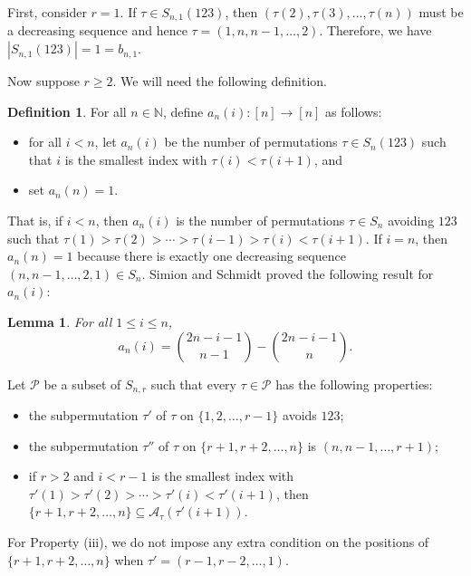\documentclass[11pt]{article}
\newtheorem{lemma}[theorem]{Lemma}
\theoremstyle{definition}
\newtheorem{definition}[theorem]{Definition}
\numberwithin{equation}{section}
\begin{document}
First, consider $r=1$. If $\tau\in S_{n,1}(123)$, then $(\tau(2),\tau(3),\ldots,\tau(n))$ must be a decreasing sequence and hence $\tau=(1,n,n-1,\ldots,2)$. Therefore, we have $|S_{n,1}(123)|=1=b_{n,1}$.

Now suppose $r\geq2$. We will need the following definition.

\begin{definition}\label{Definition:AscendIn123Avoiding}
For all $n\in\mathbb{N}$, define $a_{n}(i):[n]\to[n]$ as follows:
\begin{itemize}
\item[(i)] for all $i<n$, let $a_{n}(i)$ be the number of permutations $\tau\in S_n(123)$ such that $i$ is the smallest index with $\tau(i)<\tau(i+1)$, and
\item[(ii)] set $a_{n}(n)=1$.
\end{itemize}
\end{definition}
That is, if $i<n$, then $a_n(i)$ is the number of permutations $\tau\in S_n$ avoiding $123$ such that $\tau(1)>\tau(2)>\cdots>\tau(i-1)>\tau(i)<\tau(i+1)$. 
If $i=n$, then $a_n(n)=1$ 
because there is exactly one decreasing sequence $(n,n-1,\ldots,2,1)\in S_n$. Simion and Schmidt \cite[Lemma 2]{SimionSchmidt1985} proved the following result for $a_n(i)$:

\begin{lemma}\label{Lemma:AscendIn123Avoiding} For all $1\leq i\leq n$,
\[
a_n(i)=\binom{2n-i-1}{n-1}-\binom{2n-i-1}{n}.
\]
\end{lemma}

Let $\mathcal{P}$ be a subset of $S_{n,r}$ such that every $\tau\in\mathcal{P}$ has the following properties:
\begin{itemize}
    \item[(i)] the subpermutation $\tau'$ of $\tau$ on $\{1,2,\ldots,r-1\}$ avoids $123$;
    \item[(ii)] the subpermutation $\tau''$ of $\tau$ on $\{r+1,r+2,\ldots,n\}$ is $(n,n-1,\ldots,r+1)$;
    \item[(iii)] if $r>2$ and $i<r-1$ is the smallest index with $\tau'(1)>\tau'(2)>\cdots>\tau'(i)<\tau'(i+1)$, then $\{r+1,r+2,\ldots,n\}\subseteq\mathcal{A}_\tau(\tau'(i+1))$.
\end{itemize}
For Property (iii), we do not impose any extra condition on the positions of $\{r+1,r+2,\ldots,n\}$ when $\tau'=(r-1,r-2,\ldots,1)$.
\end{document}
